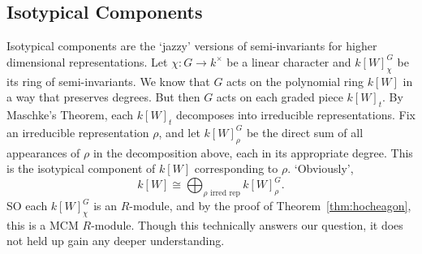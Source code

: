 \subsection{Isotypical Components}

Isotypical components are the `jazzy' versions of semi-invariants for higher dimensional representations. Let $\chi: G \to k^\times$ be a linear character and $k[W]^G_\chi$ be its ring of semi-invariants. We know that $G$ acts on the polynomial ring $k[W]$ in a way that preserves degrees. But then $G$ acts on each graded piece $k[W]_t$. By Maschke's Theorem, each $k[W]_t$ decomposes into irreducible representations. Fix an irreducible representation $\rho$, and let $k[W]_\rho^G$ be the direct sum of all appearances of $\rho$ in the decomposition above, each in its appropriate degree. This is the isotypical component of $k[W]$ corresponding to $\rho$. `Obviously', 
	\[
	k[W] \cong \bigoplus_{\rho \text{ irred rep}} k[W]_\rho^G. 
	\]
SO each $k[W]^G_\chi$ is an $R$-module, and by the proof of Theorem~\ref{thm:hocheagon}, this is a MCM $R$-module. Though this technically answers our question, it does not held up gain any deeper understanding. 





























